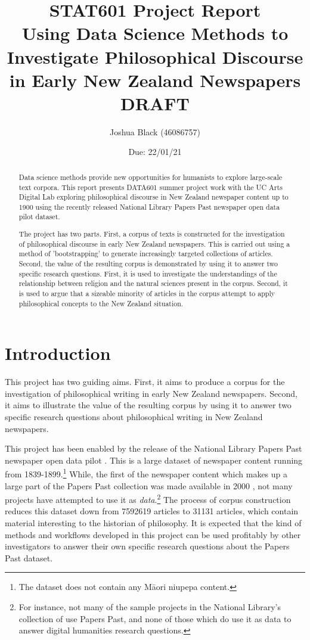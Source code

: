 \documentclass{article}
\title{\textbf{STAT601 Project Report} \\ Using Data Science Methods to
Investigate Philosophical Discourse in Early New Zealand Newspapers \\ DRAFT}
\author{Joshua Black (46086757)}
\date{Due: 22/01/21}
\begin{document}
\maketitle

\begin{abstract}
  Data science methods provide new opportunities for humanists to explore
  large-scale text corpora. This report presents DATA601 summer project work
  with the UC Arts Digital Lab exploring philosophical discourse in
  New Zealand newspaper content up to 1900 using the
  recently released National Library Papers Past newspaper open data pilot
  dataset.

  The project has two parts.
  First, a corpus of texts is constructed for the
  investigation of philosophical discourse in early New Zealand newspapers.
  This is carried out using a method of 'bootstrapping' to generate increasingly
  targeted collections of articles. Second, the value of the resulting corpus is demonstrated by using it to answer two specific research questions. First, it is used to investigate the understandings of the relationship between religion and the natural sciences present in the corpus. Second, it is used
  to argue that a sizeable minority of articles in the corpus attempt to apply philosophical concepts to the New Zealand situation.
\end{abstract}

\tableofcontents

\section*{Introduction}

This project has two guiding aims. First, it aims to produce a corpus for the investigation of philosophical writing in early New Zealand newspapers.
Second, it aims to illustrate the value of the resulting corpus by using it to
answer two specific research questions about philosophical writing in New Zealand newspapers.

This project has been enabled by the release of the National Library Papers Past newspaper open data pilot \cite{ppnodp}. This is a large dataset of newspaper content running from 1839-1899.\footnote{
The dataset does not contain any Māori niupepa content.} While, the first of the newspaper content which makes up a large part of the Papers Past collection was made available in 2000 \cite{pp-about}, not many projects have attempted to use it as \emph{data}.\footnote{For instance, not many of the sample projects in the National Library's collection of \cite{ppnodp-projects} use Papers Past, and none of those which do use it as data to answer digital humanities research questions.}
The process of corpus construction reduces this dataset down from 7592619 articles to 31131 articles, which contain material interesting to the historian of philosophy. It is expected that the kind of methods and workflows developed in this project can be used profitably by other investigators to answer their own specific research questions about the Papers Past dataset.
\end{document}
